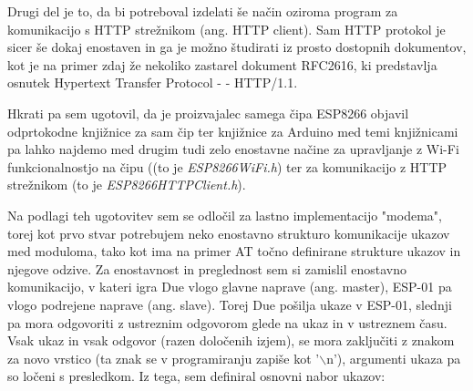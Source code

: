 \documentclass[12pt,a4paper,twoside,openright,slovene]{book}
\begin{document}
Drugi del je to, da bi potreboval izdelati še način oziroma program za komunikacijo s HTTP strežnikom (ang. HTTP client). Sam HTTP protokol je sicer še dokaj enostaven in ga je možno študirati iz prosto dostopnih dokumentov, kot je na primer zdaj že nekoliko zastarel dokument RFC2616, ki predstavlja osnutek Hypertext Transfer Protocol - - HTTP/1.1.

Hkrati pa sem ugotovil, da je proizvajalec samega čipa ESP8266 objavil odprtokodne knjižnice za sam čip ter knjižnice za Arduino med temi knjižnicami pa lahko najdemo med drugim tudi zelo enostavne načine za upravljanje z Wi-Fi funkcionalnostjo na čipu ((to je \textit{ESP8266WiFi.h}) ter za komunikacijo z HTTP strežnikom (to je \textit{ESP8266HTTPClient.h}).

Na podlagi teh ugotovitev sem se odločil za lastno implementacijo "modema", torej kot prvo stvar potrebujem neko enostavno strukturo komunikacije ukazov med moduloma, tako kot ima na primer AT točno definirane strukture ukazov in njegove odzive. Za enostavnost in preglednost sem si zamislil enostavno komunikacijo, v kateri igra Due vlogo glavne naprave (ang. master), ESP-01 pa vlogo podrejene naprave (ang. slave). Torej Due pošilja ukaze v ESP-01, slednji pa mora odgovoriti z ustreznim odgovorom glede na ukaz in v ustreznem času. Vsak ukaz in vsak odgovor (razen določenih izjem), se mora zaključiti z znakom za novo vrstico (ta znak se v programiranju zapiše kot '$\backslash$n'), argumenti ukaza pa so ločeni s presledkom. Iz tega, sem definiral osnovni nabor ukazov:
\end{document}
